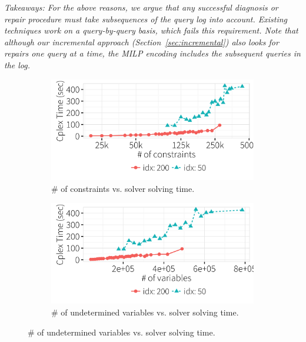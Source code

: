 {\it Takeaways: For the above reasons, we argue that any successful diagnosis or repair procedure must take subsequences of the query log into account.
Existing techniques work on a query-by-query basis, which fails this requirement.  
Note that although our incremental approach (Section~\ref{sec:incremental}) also looks for repairs one query at a time, 
the MILP encoding includes the subsequent queries in the log.}

\iffalse
  \begin{figure}[t]
  \centering
      \begin{subfigure} [t]{.3\textwidth}
    \includegraphics[width = .99\columnwidth]{figures/num_cons_time}
    \vspace*{-.25in}
    \caption{\# of constraints vs. solver solving time.}
    \vspace*{-.1in}
    \label{f:cons_vs_time} 
    \end{subfigure}
    \begin{subfigure} [t]{.3\textwidth}
    \includegraphics[width = .99\columnwidth]{figures/num_vars_time}
    \vspace*{-.25in}
    \caption{\# of undetermined variables vs. solver solving time.}
    \vspace*{-.1in}
    \label{f:var_vs_time} 

\end{subfigure}
\end{figure}
